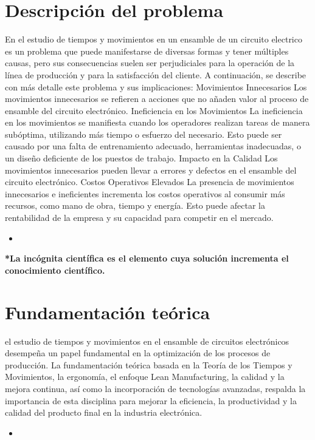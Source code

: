     \section{Descripción del problema}
    En el estudio de tiempos y movimientos en un ensamble de un circuito electrico es un problema que puede manifestarse de diversas formas y tener múltiples causas, pero sus consecuencias suelen ser perjudiciales para la operación de la línea de producción y para la satisfacción del cliente. A continuación, se describe con más detalle este problema y sus implicaciones:
    Movimientos Innecesarios
    Los movimientos innecesarios se refieren a acciones que no añaden valor al proceso de ensamble del circuito electrónico.
    Ineficiencia en los Movimientos
    La ineficiencia en los movimientos se manifiesta cuando los operadores realizan tareas de manera subóptima, utilizando más tiempo o esfuerzo del necesario. Esto puede ser causado por una falta de entrenamiento adecuado, herramientas inadecuadas, o un diseño deficiente de los puestos de trabajo.
    Impacto en la Calidad
    Los movimientos innecesarios pueden llevar a errores y defectos en el ensamble del circuito electrónico. 
    Costos Operativos Elevados
    La presencia de movimientos innecesarios e ineficientes incrementa los costos operativos al consumir más recursos, como mano de obra, tiempo y energía. Esto puede afectar la rentabilidad de la empresa y su capacidad para competir en el mercado.
    \begin{itemize}
        \item 
    \end{itemize}
    
    \textbf{*La incógnita científica es el elemento cuya solución incrementa el conocimiento científico.}
    \section{Fundamentación teórica}
    el estudio de tiempos y movimientos en el ensamble de circuitos electrónicos desempeña un papel fundamental en la optimización de los procesos de producción. La fundamentación teórica basada en la Teoría de los Tiempos y Movimientos, la ergonomía, el enfoque Lean Manufacturing, la calidad y la mejora continua, así como la incorporación de tecnologías avanzadas, respalda la importancia de esta disciplina para mejorar la eficiencia, la productividad y la calidad del producto final en la industria electrónica.
    \begin{itemize}
        \item 
    \end{itemize}
